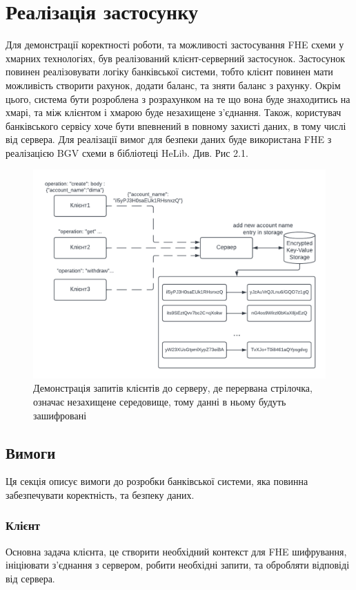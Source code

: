 \section{Реалізація застосунку}
Для демонстрації коректності роботи, та можливості застосування FHE схеми у хмарних 
технологіях, був реалізований клієнт-серверний застосунок. Застосунок повинен реалізовувати
логіку банківської системи, тобто клієнт повинен мати можливість створити рахунок,
додати баланс, та зняти баланс з рахунку. Окрім цього, система бути розроблена з розрахунком
на те що вона буде знаходитись на хмарі, та між клієнтом і хмарою буде незахищене з'єднання.
Також, користувач банківського сервісу хоче бути впевнений в повному захисті даних, в тому
числі від сервера. Для реалізації вимог для безпеки даних буде використана FHE з реалізацією
BGV схеми в бібліотеці HeLib. Див. Рис 2.1.

\begin{figure}[!ht]
    \centering
    \includegraphics{static/client-server-logic.png}
    \caption{Демонстрація запитів клієнтів до серверу, де перервана стрілочка, означає
    незахищене середовище, тому данні в ньому будуть зашифровані}
    \label{fig:client-server-logic}
\end{figure}

\subsection{Вимоги}
Ця секція описує вимоги до розробки банківської системи, яка повинна забезпечувати коректність,
та безпеку даних.
\subsubsection*{Клієнт}
Основна задача клієнта, це створити необхідний контекст для FHE шифрування, ініціювати
з'єднання з сервером, робити необхідні запити, та обробляти відповіді від сервера.

